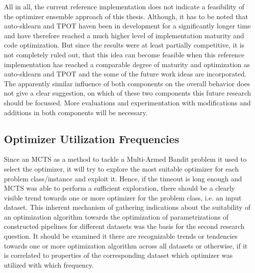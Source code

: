 All in all, the current reference implementation does not indicate a feasibility of the optimizer ensemble approach of this thesis.
Although, it has to be noted that auto-sklearn and TPOT haven been in development for a significantly longer time and have therefore reached a much higher level of implementation maturity and code optimization.\newline
But since the results were at least partially competitive, it is not completely ruled out, that this idea can become feasible when this reference implementation has reached a comparable degree of maturity and optimization as auto-sklearn and TPOT and the some of the future work ideas are incorporated.\newline
The apparently similar influence of both components on the overall behavior does not give a clear suggestion, on which of these two components this future research should be focussed.
More evaluations and experimentation with modifications and additions in both components will be necessary.

\subsection{Optimizer Utilization Frequencies}
\label{sec:evaluation:analysis:optimizer}
Since an MCTS as a method to tackle a Multi-Armed Bandit problem it used to select the optimizer, it will try to explore the most suitable optimizer for each problem class/instance and exploit it.
Hence, if the timeout is long enough and MCTS was able to perform a sufficient exploration, there should be a clearly visible trend towards one or more optimizer for the problem class, i.e. an input dataset.\newline
This inherent mechanism of gathering indications about the suitability of an optimization algorithm towards the optimization of parametrizations of constructed pipelines for different datasets was the basis for the second research question.\newline
It should be examined it there are recognizable trends or tendencies towards one or more optimization algorithm across all datasets or otherwise, if it is correlated to properties of the corresponding dataset which optimizer was utilized with which frequency.

